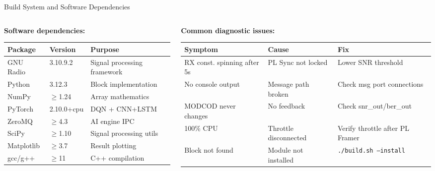 \documentclass[aspectratio=169,10pt]{beamer}
\begin{document}
\begin{frame}[shrink=20]{Build System and Software Dependencies}
\begin{columns}[T]
\begin{column}{0.50\textwidth}
      \vspace{0.3em}
      \textbf{Software dependencies:}
      {\scriptsize
      \begin{tabular}{lll}
        \toprule
        \textbf{Package} & \textbf{Version} & \textbf{Purpose}\\
        \midrule
        GNU Radio  & 3.10.9.2   & Signal processing framework\\
        Python     & 3.12.3     & Block implementation\\
        NumPy      & $\geq$1.24 & Array mathematics\\
        PyTorch    & 2.10.0+cpu & DQN + CNN+LSTM\\
        ZeroMQ     & $\geq$4.3  & AI engine IPC\\
        SciPy      & $\geq$1.10 & Signal processing utils\\
        Matplotlib & $\geq$3.7  & Result plotting\\
        gcc/g++    & $\geq$11   & C++ compilation\\
        \bottomrule
      \end{tabular}}
    \end{column}
    \begin{column}{0.46\textwidth}
      \textbf{Common diagnostic issues:}
      {\scriptsize
      \begin{tabular}{p{2.5cm}p{2.0cm}p{1.8cm}}
        \toprule
        \textbf{Symptom} & \textbf{Cause} & \textbf{Fix}\\
        \midrule
        RX const. spinning after 5s & PL Sync not locked & Lower SNR threshold\\
        No console output & Message path broken & Check msg port connections\\
        MODCOD never changes & No feedback & Check snr\_out/ber\_out\\
        100\% CPU & Throttle disconnected & Verify throttle after PL Framer\\
        Block not found & Module not installed & \texttt{./build.sh --install}\\
        \bottomrule
      \end{tabular}}


\end{column}
\end{columns}
\end{frame}
\end{document}
